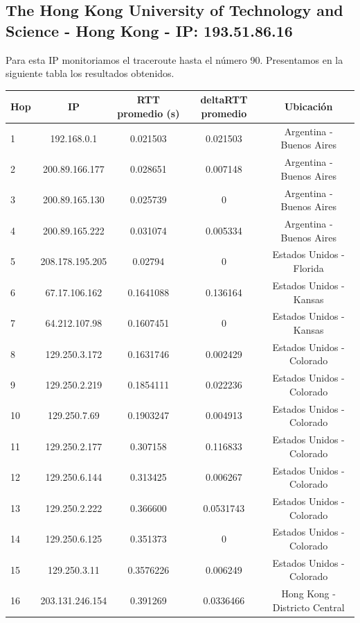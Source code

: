 \subsection{The Hong Kong University of Technology and Science - Hong Kong - IP: 193.51.86.16}

Para esta IP monitoriamos el traceroute hasta el número 90. Presentamos en la siguiente tabla los resultados obtenidos.

\bigskip

\begin{tabular}{ | l | c | c | c | c |}
	\hline
		Hop & IP &  RTT promedio (s)  & deltaRTT promedio & Ubicación\\
 	\hline
		1  &  192.168.0.1  &  0.021503 &  0.021503 & Argentina - Buenos Aires \\
	\hline
		2  &  200.89.166.177  &  0.028651 &  0.007148 & Argentina - Buenos Aires\\
	\hline
		3  &  200.89.165.130  &  0.025739 &  0 & Argentina - Buenos Aires\\
	\hline
		4  &  200.89.165.222  &  0.031074 &  0.005334 & Argentina - Buenos Aires\\
	\hline
		5  &  208.178.195.205  &  0.02794 &  0 & Estados Unidos - Florida \\
	\hline
		6  &  67.17.106.162  &  0.1641088 &  0.136164 & Estados Unidos - Kansas \\
	\hline
		7  &  64.212.107.98  &  0.1607451 &  0 & Estados Unidos - Kansas \\
	\hline
		8  &  129.250.3.172  &  0.1631746 &  0.002429 & Estados Unidos - Colorado \\
	\hline
		9  &  129.250.2.219  &  0.1854111 &  0.022236 & Estados Unidos - Colorado\\
	\hline
		10  &  129.250.7.69  &  0.1903247 &  0.004913 & Estados Unidos - Colorado \\
	\hline
		11  &  129.250.2.177  &  0.307158 &  0.116833 & Estados Unidos - Colorado \\
	\hline
		12  &  129.250.6.144  &  0.313425 &  0.006267 & Estados Unidos - Colorado\\
	\hline
		13  &  129.250.2.222  &  0.366600 &  0.0531743 & Estados Unidos - Colorado\\
	\hline
		14  &  129.250.6.125  &  0.351373 &  0 & Estados Unidos - Colorado \\
	\hline
		15  &  129.250.3.11  &  0.3576226 &  0.006249 & Estados Unidos - Colorado\\
	\hline
		16  &  203.131.246.154 &  0.391269 &  0.0336466 & Hong Kong - Districto Central \\

\end{tabular}
